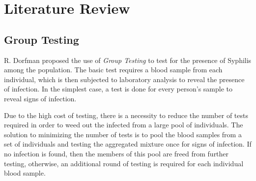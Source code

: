 \documentclass[10pt]{article}
\begin{document}
\section{Literature Review}

\subsection{Group Testing}

R. Dorfman proposed the use of \emph{Group Testing} to test for the presence of Syphilis \cite{Dorfman1943} among the population. The basic test requires a blood sample from each individual, which is then subjected to laboratory analysis to reveal the presence of infection. In the simplest case, a test is done for every person's sample to reveal signs of infection. 

Due to the high cost of testing, there is a necessity to reduce the number of tests required in order to weed out the infected from a large pool of individuals. The solution to minimizing the number of tests is to pool the blood samples from a set of individuals and testing the aggregated mixture once for signs of infection. If no infection is found, then the members of this pool are freed from further testing, otherwise, an additional round of testing is required for each individual blood sample.
\end{document}
